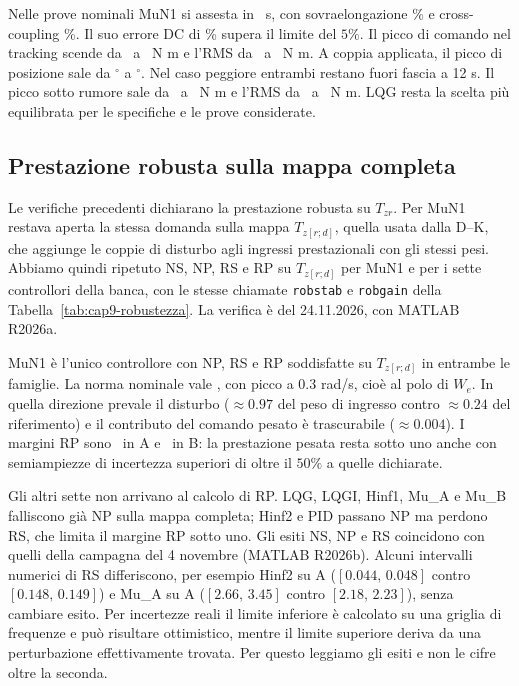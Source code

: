 Nelle prove nominali MuN1 si assesta in \FinMuNOneTs\ s,
con sovraelongazione \FinMuNOneMp\% e cross-coupling
\FinMuNOneCross\%. Il suo errore DC di \FinMuNOneDC\%
supera il limite del $5\%$. Il picco di comando nel tracking
scende da \FinLQGTrackPeak\ a \FinMuNOnePiccoComando\ N m e
l'RMS da \FinLQGRMSComando\ a \FinMuNOneRMSComando\ N m.
A coppia applicata, il picco di posizione sale da
\FinLQGDisturboStudio$^\circ$ a \FinMuNOneDisturbo$^\circ$.
Nel caso peggiore entrambi restano fuori fascia a 12 s. Il picco sotto rumore sale da
\FinLQGPeak\ a \FinMuNOneRumore\ N m e l'RMS da
\FinLQGRms\ a \FinMuNOneRMSRumore\ N m. LQG resta la scelta
più equilibrata per le specifiche e le prove considerate.

\subsection{Prestazione robusta sulla mappa completa}

Le verifiche precedenti dichiarano la prestazione robusta su
$T_{zr}$. Per MuN1 restava aperta la stessa domanda sulla mappa
$T_{z[r;d]}$, quella usata dalla D--K, che aggiunge le coppie di
disturbo agli ingressi prestazionali con gli stessi pesi. Abbiamo
quindi ripetuto NS, NP, RS e RP su $T_{z[r;d]}$ per MuN1 e per i
sette controllori della banca, con le stesse chiamate
\texttt{robstab} e \texttt{robgain} della
Tabella~\ref{tab:cap9-robustezza}. La verifica è del 24.11.2026,
con MATLAB R2026a.



MuN1 è l'unico controllore con NP, RS e RP soddisfatte su
$T_{z[r;d]}$ in entrambe le famiglie. La norma nominale vale
\FinMuNOneNorma, con picco a $0.3$ rad/s, cioè al polo di $W_e$.
In quella direzione prevale il disturbo ($\approx0.97$ del peso di
ingresso contro $\approx0.24$ del riferimento) e il contributo del
comando pesato è trascurabile ($\approx0.004$). I margini RP sono
\FinMuNOneRPrdA\ in A e \FinMuNOneRPrdB\ in B: la prestazione
pesata resta sotto uno anche con semiampiezze di incertezza
superiori di oltre il $50\%$ a quelle dichiarate.

Gli altri sette non arrivano al calcolo di RP. LQG, LQGI, Hinf1,
Mu\_A e Mu\_B falliscono già NP sulla mappa completa; Hinf2 e PID
passano NP ma perdono RS, che limita il margine RP sotto uno.
Gli esiti NS, NP e RS coincidono con quelli della campagna del
4 novembre (MATLAB R2026b). Alcuni intervalli numerici di RS
differiscono, per esempio Hinf2 su A ($[0.044,\,0.048]$ contro
$[0.148,\,0.149]$) e Mu\_A su A ($[2.66,\,3.45]$ contro
$[2.18,\,2.23]$), senza cambiare esito. Per incertezze reali il
limite inferiore è calcolato su una griglia di frequenze e può
risultare ottimistico, mentre il limite superiore deriva da una
perturbazione effettivamente trovata. Per questo leggiamo gli esiti
e non le cifre oltre la seconda.

